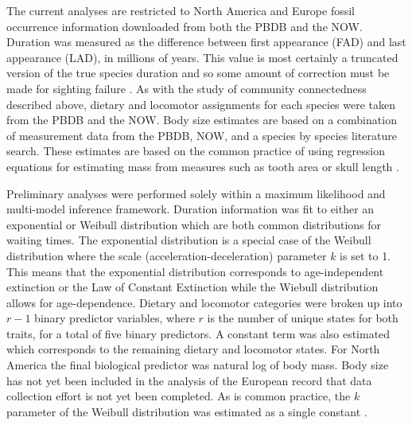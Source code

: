 \documentclass[11pt,letterpaper]{article}
\begin{document}
The current analyses are restricted to North America and Europe fossil occurrence information downloaded from both the PBDB and the NOW. Duration was measured as the difference between first appearance (FAD) and last appearance (LAD), in millions of years. This value is most certainly a truncated version of the true species duration and so some amount of correction must be made for sighting failure \citep{Alroy2014a,Solow1997,Strauss1989}. As with the study of community connectedness described above, dietary and locomotor assignments for each species were taken from the PBDB and the NOW. Body size estimates are based on a combination of measurement data from the PBDB, NOW, and a species by species literature search. These estimates are based on the common practice of using regression equations for estimating mass from measures such as tooth area or skull length \citep{Alroy1998,Tomiya2013,Jernvall2004,Alroy2009,Slater2013a}. 

Preliminary analyses were performed solely within a maximum likelihood and multi-model inference framework. Duration information was fit to either an exponential or Weibull distribution which are both common distributions for waiting times. The exponential distribution is a special case of the Weibull distribution where the scale (acceleration-deceleration) parameter \(k\) is set to 1. This means that the exponential distribution corresponds to age-independent extinction or the Law of Constant Extinction \citep{VanValen1973} while the Wiebull distribution allows for age-dependence. Dietary and locomotor categories were broken up into \(r - 1\) binary predictor variables, where \(r\) is the number of unique states for both traits, for a total of five binary predictors. A constant term was also estimated which corresponds to the remaining dietary and locomotor states. For North America the final biological predictor was natural log of body mass. Body size has not yet been included in the analysis of the European record that data collection effort is not yet been completed. As is common practice, the \(k\) parameter of the Weibull distribution was estimated as a single constant \citep{Kleinbaum2005}.
\end{document}
